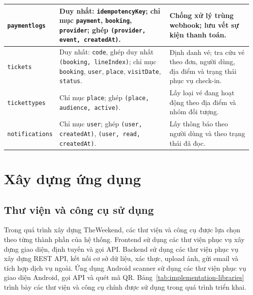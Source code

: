 ﻿\documentclass[../DoAn.tex]{subfiles}
\begin{document}
\begin{longtable}{|L{3.0cm}|L{6.1cm}|L{4.5cm}|}
\hline
\texttt{paymentlogs} & Duy nhất: \texttt{idempotencyKey}; chỉ mục \texttt{payment}, \texttt{booking}, \texttt{provider}; ghép \texttt{(provider, event, createdAt)}. & Chống xử lý trùng webhook; lưu vết sự kiện thanh toán. \\
\hline
\texttt{tickets} & Duy nhất: \texttt{code}, ghép duy nhất \texttt{(booking, lineIndex)}; chỉ mục \texttt{booking}, \texttt{user}, \texttt{place}, \texttt{visitDate}, \texttt{status}. & Định danh vé; tra cứu vé theo đơn, người dùng, địa điểm và trạng thái phục vụ check-in. \\
\hline
\texttt{tickettypes} & Chỉ mục \texttt{place}; ghép \texttt{(place, audience, active)}. & Lấy loại vé đang hoạt động theo địa điểm và nhóm đối tượng. \\
\hline
\texttt{notifications} & Chỉ mục \texttt{user}; ghép \texttt{(user, createdAt)}, \texttt{(user, read, createdAt)}. & Lấy thông báo theo người dùng và theo trạng thái đã đọc. \\
\hline
\end{longtable}
\endgroup

\section{Xây dựng ứng dụng}

\subsection{Thư viện và công cụ sử dụng}

Trong quá trình xây dựng TheWeekend, các thư viện và công cụ được lựa chọn theo từng thành phần của hệ thống. Frontend sử dụng các thư viện phục vụ xây dựng giao diện, định tuyến và gọi API. Backend sử dụng các thư viện phục vụ xây dựng REST API, kết nối cơ sở dữ liệu, xác thực, upload ảnh, gửi email và tích hợp dịch vụ ngoài. Ứng dụng Android scanner sử dụng các thư viện phục vụ giao diện Android, gọi API và quét mã QR. Bảng~\ref{tab:implementation-libraries} trình bày các thư viện và công cụ chính được sử dụng trong quá trình triển khai.
\end{document}

